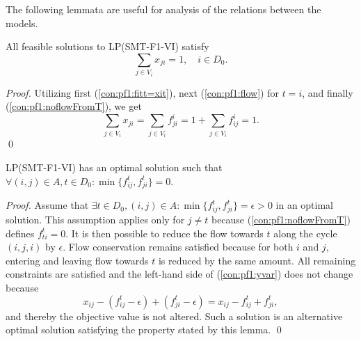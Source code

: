 The following lemmata are useful for analysis of the relations between the models. 
\begin{lemma}\label{lem:sumxji1}
All feasible solutions to LP(SMT-F1-VI) satisfy
\begin{equation}
\sum_{j\in V_i}x_{ji}=1,\quad i\in D_0.  \label{eq:sumToD} 
\end{equation}
\end{lemma}
\begin{proof}
 Utilizing first (\ref{con:pf1:fitt=xit}), next (\ref{con:pf1:flow}) for $t=i$, and finally (\ref{con:pf1:noflowFromT}), we get
$$\sum_{j\in V_i}x_{ji}=\sum_{j\in V_i}f_{ji}^i = 1+\sum_{j\in V_i}f_{ij}^i=1.$$\qed
\end{proof}
\begin{lemma}\label{lem:onedir} LP(SMT-F1-VI) has an optimal solution such that \newline
$\forall (i,j)\in A, t\in D_0: \min\{f_{ij}^t,f_{ji}^t\} = 0.$
\end{lemma}
\begin{proof}
Assume that $\exists t\in D_0, (i,j)\in A: \min\{f_{ij}^t,f_{ji}^t\} = \epsilon> 0$ in an optimal solution.
This assumption applies only for $j\neq t$ because (\ref{con:pf1:noflowFromT}) defines $f^t_{ti}=0$.
It is then possible to reduce the flow towards $t$ along the cycle $(i,j,i)$ by $\epsilon$.
Flow conservation remains satisfied because for both $i$ and $j$, entering and leaving flow towards $t$ is reduced by the same amount.
All remaining constraints are satisfied and the left-hand side of (\ref{con:pf1:yvar}) does not change because 
$$
x_{ij}-(f_{ij}^t-\epsilon)+(f_{ji}^t-\epsilon) = x_{ij}-f_{ij}^t+f_{ji}^t,
$$
and thereby the objective value is not altered. Such a solution is an alternative optimal solution satisfying the property stated by this lemma.  \qed
\end{proof}
